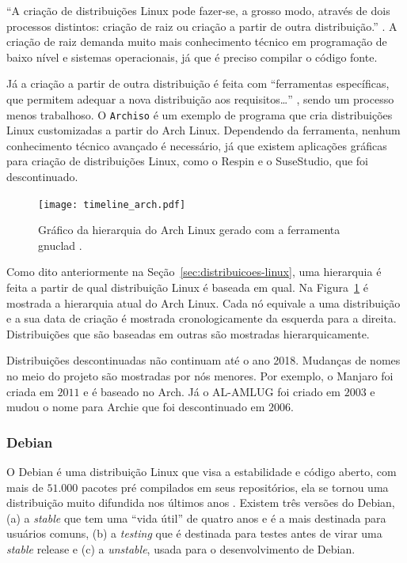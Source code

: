 \documentclass[
article,			%
12pt,				%
openright,			%
oneside,			%
a4paper,			%
chapter=TITLE,		%
section=TITLE,		%
subsection=TITLE,	%
subsubsection=TITLE,%
subsubsubsection=TITLE, %
english,			%
brazil,				%
]{abntex2}
\def\code#1{\texttt{#1}}
\begin{document}
``A criação  de  distribuições  Linux pode fazer-se, a grosso modo,
através  de  dois processos distintos: criação de raiz ou criação a
partir de outra distribuição.'' \cite[p.  78]{Nunes2009}. A criação de
raiz demanda muito mais conhecimento técnico em programação de baixo
nível e sistemas operacionais, já que é preciso compilar o código
fonte.

Já a criação a partir de outra distribuição é feita com ``ferramentas
específicas, que  permitem adequar  a  nova  distribuição  aos
requisitos\ldots'' \cite[p. 78]{Nunes2009}, sendo um processo menos
trabalhoso. O \code{Archiso} é um exemplo de programa que cria
distribuições Linux customizadas a partir do Arch Linux. Dependendo da
ferramenta, nenhum conhecimento técnico avançado é necessário, já que
existem aplicações gráficas para criação de distribuições Linux, como
o Respin \cite{Respin2018} e o SuseStudio, que foi descontinuado.


\begin{figure}[H]
    \caption{\label{fig:hierarquia-arch}Gráfico da hierarquia do Arch
    Linux gerado com a ferramenta gnuclad \cite{Loli2017}.}
    \begin{center}
        \texttt{[image: timeline\_arch.pdf]}
    \end{center}
\end{figure}

Como dito anteriormente na Seção~\ref{sec:distribuicoes-linux}, uma
hierarquia é feita a partir de qual distribuição Linux é baseada em
qual. Na Figura~\ref{fig:hierarquia-arch} é mostrada a hierarquia
atual do Arch Linux. Cada nó equivale a uma distribuição e a sua data
de criação é mostrada cronologicamente da esquerda para a direita.
Distribuições que são baseadas em outras são mostradas
hierarquicamente. 

Distribuições descontinuadas não continuam até o ano 2018. Mudanças de
nomes no meio do projeto são mostradas por nós menores. Por exemplo, o
Manjaro foi criada em $2011$ e é baseado no Arch. Já o AL-AMLUG foi
criado em $2003$ e mudou o nome para Archie que foi descontinuado em
$2006$.

\subsubsection{Debian}

O Debian é uma distribuição Linux que visa a estabilidade e código
aberto, com mais de $51.000$ pacotes pré compilados em seus
repositórios, ela se tornou uma distribuição muito difundida nos
últimos anos \cite{Debian2018}. Existem três versões do Debian,
(a) a \emph{stable} que tem uma ``vida útil'' de quatro anos e é a
mais destinada para usuários comuns, (b) a \emph{testing} que é
destinada para testes antes de virar uma \emph{stable} release e (c) a
\emph{unstable}, usada para o desenvolvimento de Debian.
\end{document}
